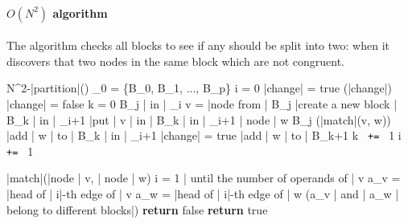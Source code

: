 \documentclass[a4paper,12pt, notitlepage]{article}
\newcommand{\negv}{\vspace{-0.7cm}}
\begin{document}
\paragraph*{$O(N^2)$ algorithm}
The algorithm checks all blocks to see if any should be split into two:
when it discovers that two nodes in the same block which are not congruent.

\begin{program}
\PROC N^2-|partition|() \BODY
    \pi_0 = \{B_0, B_1, ..., B_p\}
    i = 0
    |change| = true
    \WHILE (|change|) \DO
        |change| = false
        k = 0
        \FOREACH B_j | in | \pi_i \DO
            v = |node from | B_j
            |create a new block | B_k | in | \pi_{i+1}
            |put | v | in | B_k | in | \pi_{i+1}
            \FOREACH | node | w \in B_j \DO
                \IF (|match|(v, w)) \AR*
                    |add | w | to | B_k | in | \pi_{i+1}
                \ELSE
                    |change| = true
                    |add | w | to | B_{k+1}
                \FI
            \OD
        k \texttt{ += } 1
    \OD
    i \texttt{ += } 1
\end{program}
\negv
\begin{program}
\PROC |match|(|node | v, | node | w) \BODY
    \FOR i = 1 | until the number of operands of | v \DO
        a_v = |head of | i|-th edge of | v
        a_w = |head of | i|-th edge of | w
        \IF (a_v | and | a_w | belong to different blocks|) \AR*
            \textbf{return } false
        \FI
    \OD
    \textbf{return } true
\end{program}
\end{document}

